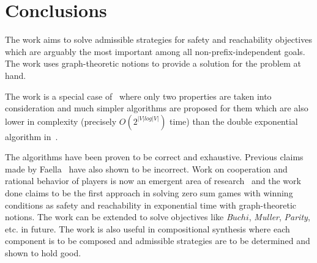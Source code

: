 \def\baselinestretch{1}
\chapter{Conclusions}
\label{chap:conclusions}
\ifpdf
    \graphicspath{{Conclusions/Figures/PNG/}{Conclusions/Figures/PDF/}{Conclusions/Figures/}}
\else
    \graphicspath{{Conclusions/Figures/EPS/}{Conclusions/Figures/}}
\fi
\def\baselinestretch{1.0}



The work aims to solve admissible strategies for safety and
reachability objectives which are arguably the most important among all non-prefix-independent goals. The work uses graph-theoretic notions to provide a solution for the problem at hand. 

The work is a special case of~\cite{PerimeterOfWorldModel,CompositionalSynthesis}
where only two properties are taken into consideration and much simpler algorithms are proposed for them which are also lower in complexity (precisely $O(2^{|V|log|V|})$ time) than the double exponential algorithm in~\cite{PerimeterOfWorldModel,CompositionalSynthesis}.

The algorithms have been proven to be correct and exhaustive. Previous claims  made by Faella~\cite{AdmissibleInfiniteGames} have also shown to be incorrect. Work on cooperation and rational behavior of players is now an emergent area of research~\cite{AssumptionSynthesis,PerimeterOfWorldModel,CompositionalSynthesis,AdmissibleInfiniteGames,RationalSynthesis} and the work done claims to be the first approach in solving zero sum games with winning conditions as safety and reachability in exponential time with graph-theoretic notions. The work can be extended to solve objectives like \textit{B$\ddot{u}chi$}, \textit{Muller}, \textit{Parity}, etc. in future. The work is also useful in compositional synthesis where each component is to be composed and admissible strategies are to be determined and shown to hold good.